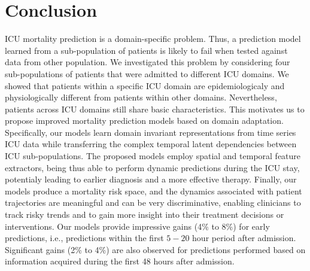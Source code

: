 \chapter{Conclusion}
\label{chap:conclusion}


ICU mortality prediction is a domain-specific problem. Thus, a prediction model learned from a sub-population of patients is likely to fail when tested against data from other population. We investigated this problem by considering four sub-populations of patients that were admitted to different ICU domains. We showed that patients within a specific ICU domain are epidemiologicaly and physiologically different from patients within other domains. Nevertheless, patients across ICU domains still share basic characteristics. This motivates us to propose improved mortality prediction models based on domain adaptation. Specifically, our models learn domain invariant representations from time series ICU data while transferring the complex temporal latent dependencies between ICU sub-populations. The proposed models employ spatial and temporal feature extractors, being thus able to perform dynamic predictions during the ICU stay, potentialy leading to earlier diagnosis and a more effective therapy. Finally, our models produce a mortality risk space, and the dynamics associated with patient trajectories are meaningful and can be very discriminative, enabling clinicians to track risky trends and to gain more insight into their treatment decisions or interventions. Our models provide impressive gains (4\% to 8\%) for early predictions, i.e., predictions within the first $5-20$ hour period after admission. Significant gains (2\% to 4\%) are also observed for predictions performed based on information acquired during the first 48 hours after admission.